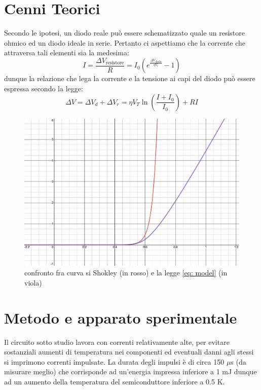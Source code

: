 \documentclass{article}[a4paper, oneside, 11pt]
\begin{document}
\section{Cenni Teorici}
Secondo le ipotesi, un diodo reale può essere schematizzato quale un resistore 
ohmico ed un diodo ideale in serie. Pertanto ci aspettiamo che la corrente che 
attraversa tali elementi sia la medesima:
\begin{equation}
	I = \frac{\Delta V_{\text{resistore}}}{R} =
	I_0 \left( e^{\frac{\Delta V_{\text{diodo}}}{\eta V_t}} - 1\right)
\end{equation}
dunque la relazione che lega la corrente e la tensione ai capi del diodo può 
essere espressa secondo la legge:
\begin{equation}\label{eq: model}
	\Delta V = \Delta V_d + \Delta V_r = \eta V_T \ln{\left(\frac{
	I+I_0}{I_0}\right)} + RI
\end{equation}
\begin{figure}[H]
	\centering 
 		\includegraphics[scale=0.25]{./confronto_curve.png}
 	\caption{confronto fra curva si Shokley (in rosso) e la legge \eqref{eq: model} (in viola)}
\end{figure}


\section{Metodo e apparato sperimentale}
Il circuito sotto studio lavora con correnti relativamente alte, per evitare 
sostanziali aumenti di temperatura nei componenti ed eventuali danni agli 
stessi si imprimono correnti impulsate.
La durata degli impulsi è di circa 150 $\mu$s (da misurare meglio) che 
corrisponde ad un'energia impressa inferiore a 1 mJ dunque ad un aumento della 
temperatura del semiconduttore inferiore a 0.5 K.
\end{document}
